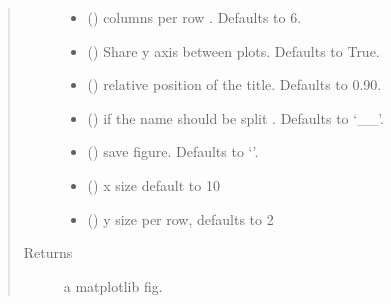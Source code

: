 \documentclass[letterpaper,10pt,english]{sphinxmanual}
\begin{document}
\begin{fulllineitems}
\begin{quote}
\begin{description}
\begin{itemize}
\item {} 
\sphinxAtStartPar
{} (\sphinxstyleliteralemphasis{\sphinxupquote{, }}) \textendash{} columns per row . Defaults to 6.

\item {} 
\sphinxAtStartPar
{} (\sphinxstyleliteralemphasis{\sphinxupquote{, }}) \textendash{} Share y axis between plots. Defaults to True.

\item {} 
\sphinxAtStartPar
{} (\sphinxstyleliteralemphasis{\sphinxupquote{, }}) \textendash{} relative position of the title. Defaults to 0.90.

\item {} 
\sphinxAtStartPar
{} (\sphinxstyleliteralemphasis{\sphinxupquote{, }}) \textendash{} if the name should be split . Defaults to ‘\_\_’.

\item {} 
\sphinxAtStartPar
{} (\sphinxstyleliteralemphasis{\sphinxupquote{, }}) \textendash{} save figure. Defaults to ‘’.

\item {} 
\sphinxAtStartPar
{} (\sphinxstyleliteralemphasis{\sphinxupquote{, }}) \textendash{} x size default to 10

\item {} 
\sphinxAtStartPar
{} (\sphinxstyleliteralemphasis{\sphinxupquote{, }}) \textendash{} y size per row, defaults to 2

\end{itemize}

\item[{Returns}] \leavevmode
\sphinxAtStartPar
a matplotlib fig.

\end{description}\end{quote}

\end{fulllineitems}
\end{document}
